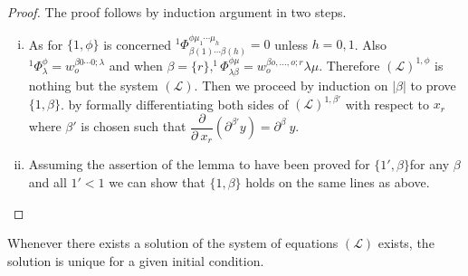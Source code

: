\begin{proof}%
  The proof follows by induction argument in two steps.  
  \begin{enumerate}[(i)]
  \item As for $\{ 1, \phi\}$ is concerned $^1{\Phi}^{\phi\mu_1 \cdots
    \mu_h}_{\beta(1) \cdots \beta(h)} = 0$ unless $h = 0, 1$. Also
    $^1\Phi^\phi_\lambda = w_o^{\beta 0 \cdots 0; \lambda}$ and when
    $\beta = \{ r\},  ^{1}\Phi^{\phi\mu}_{\lambda \beta} = w^{\beta o,
    \ldots,  o; r}_o \lambda \mu$. Therefore  $(\mathscr{L})^{1,
    \phi}$ is nothing but the system $(\mathscr{L})$. Then we proceed
    by induction on $ | \beta |$ to prove $\{ 1,  \beta\}$. by
    formally differentiating both sides of $(\mathscr{L})^{1, \beta'}$
    with respect to $x_r$ where $\beta'$ is chosen such that
    $\dfrac{\partial}{\partial ~ x_r} (\partial^{\beta'} y) =
    \partial^{\beta} ~ y$. 
  \item Assuming the assertion of the lemma to have been proved for
    $\{ 1', \beta\}$\pageoriginale for any $\beta$ and all $1' < 1$ we can show that
    $\{ 1, \beta\}$ holds on the same lines as above. 
  \end{enumerate}
\end{proof}

\begin{lemma}\label{chap1:sec1.6:lem2}%
  Whenever there exists a solution of the system of equations
  $(\mathscr{L})$ exists,  the solution is unique for a given initial
  condition. 
\end{lemma}

